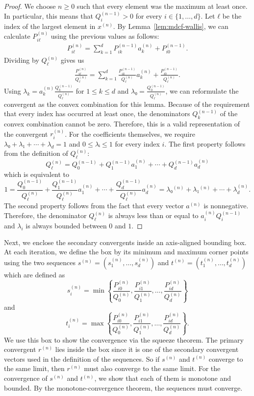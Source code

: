 \begin{proof}
  We choose $n ≥ 0$ such that every element was the maximum at least once.
  In particular, this means that $Q_i^{(n-1)} > 0$ for every $i ∈ \{1, …, d\}$.
  Let $ℓ$ be the index of the largest element in $x^{(n)}$.
  By Lemma~\ref{lem:mdcf-wallis}, we can calculate $P_{iℓ}^{(n)}$ using the previous values as follows:
  \begin{align*}
    P_{iℓ}^{(n)} = \sum_{k = 1}^d P_{ik}^{(n-1)} a_k^{(n)} + P_{i0}^{(n-1)}.
  \end{align*}
  Dividing by $Q_ℓ^{(n)}$ gives us
  \begin{align*}
    \frac{P_{iℓ}^{(n)}}{Q_ℓ^{(n)}} = \sum_{k = 1}^d \frac{P_{ik}^{(n-1)}}{Q_ℓ^{(n)}} a_k^{(n)} + \frac{P_{i0}^{(n-1)}}{Q_ℓ^{(n)}}.
  \end{align*}
  Using $λ_k = a_k^{(n)} \frac{Q_k^{(n-1)}}{Q_ℓ^{(n)}}$ for $1 ≤ k ≤ d$ and $λ₀ = \frac{Q_0^{(n-1)}}{Q_ℓ^{(n)}}$,
  we can reformulate the convergent as the convex combination for this lemma.
  Because of the requirement that every index has occurred at least once,
  the denominators $Q_k^{(n-1)}$ of the convex combination cannot be zero.
  Therefore, this is a valid representation of the convergent $r_i^{(n)}$.
  For the coefficients themselves, we require $λ₀ + λ₁ + ⋯ + λ_d = 1$ and $0 ≤ λᵢ ≤ 1$ for every index $i$.
  The first property follows from the definition of $Q_ℓ^{(n)}$:
  \[
    Q_ℓ^{(n)} = Q_0^{(n-1)} + Q_1^{(n-1)} a_1^{(n)} + ⋯ + Q_d^{(n-1)} a_d^{(n)}
  \]
  which is equivalent to
  \[
    1 = \frac{Q_0^{(n-1)}}{Q_ℓ^{(n)}} + \frac{Q_1^{(n-1)}}{Q_ℓ^{(n)}} a_1^{(n)} + ⋯ + \frac{Q_d^{(n-1)}}{Q_ℓ^{(n)}} a_d^{(n)} = λ₀^{(n)} + λ₁^{(n)} + ⋯ + λ_d^{(n)}.
  \]
  The second property follows from the fact that every vector $a^{(n)}$ is nonnegative.
  Therefore, the denominator $Q_ℓ^{(n)}$ is always less than or equal to $a_i^{(n)} Q_i^{(n-1)}$ and
  $λ_i$ is always bounded between $0$ and $1$.
\end{proof}

Next, we enclose the secondary convergents inside an axis-aligned bounding box.
At each iteration, we define the box by its minimum and maximum corner points using the two sequences
$s^{(n)} = (s_1^{(n)}, …, s_d^{(n)})$ and $t^{(n)} = (t_1^{(n)}, …, t_d^{(n)})$ which are defined as
\[
  s_i^{(n)} = \min\left\{\frac{P_{i0}^{(n)}}{Q_0^{(n)}}, \frac{P_{i1}^{(n)}}{Q_1^{(n)}}, …, \frac{P_{id}^{(n)}}{Q_d^{(n)}}\right\}
\]
and
\[
  t_i^{(n)} = \max\left\{\frac{P_{i0}^{(n)}}{Q_0^{(n)}}, \frac{P_{i1}^{(n)}}{Q_1^{(n)}}, …, \frac{P_{id}^{(n)}}{Q_d^{(n)}}\right\}.
\]
We use this box to show the convergence via the squeeze theorem.
The primary convergent $r^{(n)}$ lies inside the box since it is one of the
secondary convergent vectors used in the definition of the sequences.
So if $s^{(n)}$ and $t^{(n)}$ converge to the same limit, then $r^{(n)}$ must
also converge to the same limit.
For the convergence of $s^{(n)}$ and $t^{(n)}$, we show that each of them is
monotone and bounded.
By the monotone-convergence theorem, the sequences must converge.


